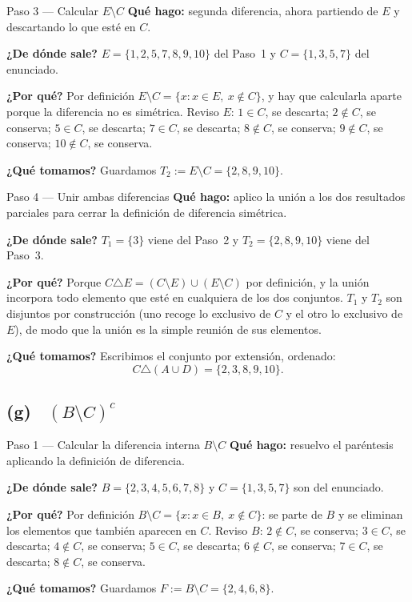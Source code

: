 \documentclass[11pt]{article}
\begin{document}
\begin{paso}{Paso 3 --- Calcular $E\setminus C$}
\textbf{Qué hago:} segunda diferencia, ahora partiendo de $E$ y descartando lo que esté en
$C$.

\textbf{¿De dónde sale?} $E=\{1,2,5,7,8,9,10\}$ del Paso~1 y $C=\{1,3,5,7\}$ del enunciado.

\textbf{¿Por qué?} Por definición $E\setminus C=\{x: x\in E,\ x\notin C\}$, y hay que
calcularla aparte porque la diferencia no es simétrica. Reviso $E$: $1\in C$, se descarta;
$2\notin C$, se conserva; $5\in C$, se descarta; $7\in C$, se descarta; $8\notin C$, se
conserva; $9\notin C$, se conserva; $10\notin C$, se conserva.

\textbf{¿Qué tomamos?} Guardamos $T_2:=E\setminus C=\{2,8,9,10\}$.
\end{paso}

\begin{paso}{Paso 4 --- Unir ambas diferencias}
\textbf{Qué hago:} aplico la unión a los dos resultados parciales para cerrar la definición de
diferencia simétrica.

\textbf{¿De dónde sale?} $T_1=\{3\}$ viene del Paso~2 y $T_2=\{2,8,9,10\}$ viene del Paso~3.

\textbf{¿Por qué?} Porque $C\triangle E=(C\setminus E)\cup(E\setminus C)$ por definición, y la
unión incorpora todo elemento que esté en cualquiera de los dos conjuntos. $T_1$ y $T_2$ son
disjuntos por construcción (uno recoge lo exclusivo de $C$ y el otro lo exclusivo de $E$), de
modo que la unión es la simple reunión de sus elementos.

\textbf{¿Qué tomamos?} Escribimos el conjunto por extensión, ordenado:
\[
C\triangle(A\cup D)=\{2,3,8,9,10\}.
\]
\end{paso}

\subsection*{(g) \ $(B\setminus C)^{c}$}

\begin{paso}{Paso 1 --- Calcular la diferencia interna $B\setminus C$}
\textbf{Qué hago:} resuelvo el paréntesis aplicando la definición de diferencia.

\textbf{¿De dónde sale?} $B=\{2,3,4,5,6,7,8\}$ y $C=\{1,3,5,7\}$ son del enunciado.

\textbf{¿Por qué?} Por definición $B\setminus C=\{x: x\in B,\ x\notin C\}$: se parte de $B$ y
se eliminan los elementos que también aparecen en $C$. Reviso $B$: $2\notin C$, se conserva;
$3\in C$, se descarta; $4\notin C$, se conserva; $5\in C$, se descarta; $6\notin C$, se
conserva; $7\in C$, se descarta; $8\notin C$, se conserva.

\textbf{¿Qué tomamos?} Guardamos $F:=B\setminus C=\{2,4,6,8\}$.
\end{paso}
\end{document}
